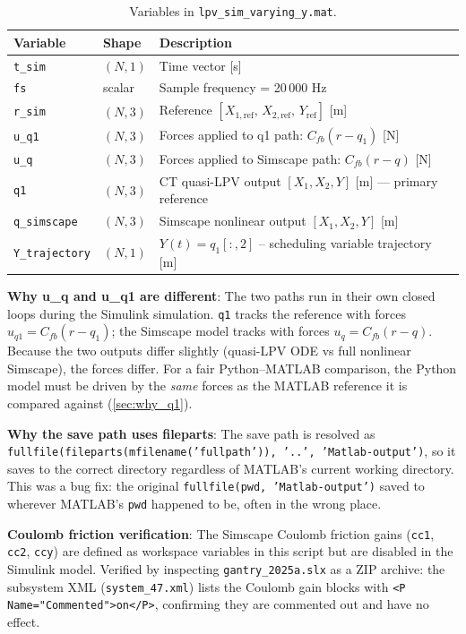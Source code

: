 \documentclass[11pt,a4paper]{article}
\begin{document}
\begin{table}[ht]
\centering
\caption{Variables in \texttt{lpv\_sim\_varying\_y.mat}.}
\label{tab:lpv_sim}
\begin{tabular}{lll}
\toprule
Variable & Shape & Description \\
\midrule
\texttt{t\_sim}        & $(N,1)$   & Time vector [s] \\
\texttt{fs}            & scalar    & Sample frequency = 20\,000 Hz \\
\texttt{r\_sim}        & $(N,3)$   & Reference $[X_{1,\text{ref}},\, X_{2,\text{ref}},\, Y_{\text{ref}}]$ [m] \\
\texttt{u\_q1}         & $(N,3)$   & Forces applied to q1 path: $C_{fb}(r - q_1)$ [N] \\
\texttt{u\_q}          & $(N,3)$   & Forces applied to Simscape path: $C_{fb}(r - q)$ [N] \\
\texttt{q1}            & $(N,3)$   & CT quasi-LPV output $[X_1, X_2, Y]$ [m] --- primary reference \\
\texttt{q\_simscape}   & $(N,3)$   & Simscape nonlinear output $[X_1, X_2, Y]$ [m] \\
\texttt{Y\_trajectory} & $(N,1)$   & $Y(t) = q_1[:,2]$ -- scheduling variable trajectory [m] \\
\bottomrule
\end{tabular}
\end{table}

\textbf{Why u\_q and u\_q1 are different}: The two paths run in their own closed loops
during the Simulink simulation. \texttt{q1} tracks the reference with forces $u_{q1} =
C_{fb}(r - q_1)$; the Simscape model tracks with forces $u_q = C_{fb}(r - q)$. Because the
two outputs differ slightly (quasi-LPV ODE vs full nonlinear Simscape), the forces differ.
For a fair Python--MATLAB comparison, the Python model must be driven by the \emph{same}
forces as the MATLAB reference it is compared against (\cref{sec:why_q1}).

\textbf{Why the save path uses fileparts}: The save path is resolved as
\texttt{fullfile(fileparts(mfilename('fullpath')), '..', 'Matlab-output')}, so it saves to
the correct directory regardless of MATLAB's current working directory. This was a bug fix:
the original \texttt{fullfile(pwd, 'Matlab-output')} saved to wherever MATLAB's \texttt{pwd}
happened to be, often in the wrong place.

\textbf{Coulomb friction verification}: The Simscape Coulomb friction gains (\texttt{cc1},
\texttt{cc2}, \texttt{ccy}) are defined as workspace variables in this script but are
disabled in the Simulink model. Verified by inspecting \texttt{gantry\_2025a.slx} as a ZIP
archive: the subsystem XML (\texttt{system\_47.xml}) lists the Coulomb gain blocks with
\texttt{<P Name="Commented">on</P>}, confirming they are commented out and have no effect.
\end{document}

